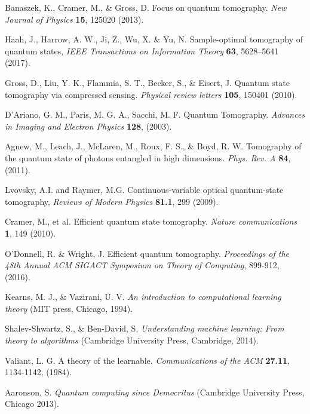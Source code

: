 \documentclass[aps,superscriptaddress,nofootinbib,twocolumn]{revtex4-1}
\begin{document}
\begin{thebibliography}{9}

 Banaszek, K., Cramer, M., \& Gross, D. 
Focus on quantum tomography. 
\textit{New Journal of Physics} \textbf{15}, 125020 (2013).

 Haah, J., Harrow, A. W., Ji, Z., Wu, X. \& Yu, N.
Sample-optimal tomography of quantum states,
\textit{IEEE Transactions on Information Theory} \textbf{63}, 5628--5641 (2017).

 Gross, D., Liu, Y. K., Flammia, S. T., Becker, S., \& Eisert, J. Quantum state tomography via compressed sensing. 
\textit{Physical review letters} \textbf{105}, 150401 (2010).

 D'Ariano, G. M., Paris, M. G. A., Sacchi, M. F.
Quantum Tomography.
\textit{Advances in Imaging and Electron Physics} \textbf{128}, (2003).

 Agnew, M., Leach, J., McLaren, M., Roux, F. S., \& Boyd, R. W.
Tomography of the quantum state of photons entangled in high dimensions.
\textit{Phys. Rev. A} \textbf{84}, (2011).

 Lvovsky, A.I. and Raymer, M.G.
Continuous-variable optical quantum-state tomography,
\textit{Reviews of Modern Physics} \textbf{81.1}, 299 (2009).

 Cramer, M., et al.
Efficient quantum state tomography. 
\textit{Nature communications} \textbf{1}, 149 (2010).

 O'Donnell, R. \& Wright, J. 
Efficient quantum tomography.
\textit{Proceedings of the 48th Annual ACM SIGACT Symposium on Theory of Computing}, 899-912, (2016).

 Kearns, M. J., \& Vazirani, U. V.
\textit{An introduction to computational learning theory} 
(MIT press, Chicago, 1994).

 Shalev-Shwartz, S., \& Ben-David, S. \textit{Understanding machine learning: From theory to algorithms}
(Cambridge University Press, Cambridge, 2014).

 Valiant, L. G.
A theory of the learnable.
\textit{Communications of the ACM} \textbf{27.11}, 1134-1142, (1984).

Aaronson, S.
\textit{Quantum computing since Democritus} (Cambridge University Press,
Chicago 2013).


\end{thebibliography}
\end{document}
